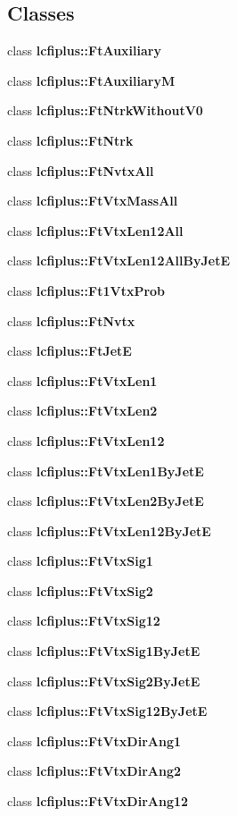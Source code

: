 \subsection*{Classes}
\begin{DoxyCompactItemize}
\item 
class {\bf lcfiplus\-::\-Ft\-Auxiliary}
\item 
class {\bf lcfiplus\-::\-Ft\-Auxiliary\-M}
\item 
class {\bf lcfiplus\-::\-Ft\-Ntrk\-Without\-V0}
\item 
class {\bf lcfiplus\-::\-Ft\-Ntrk}
\item 
class {\bf lcfiplus\-::\-Ft\-Nvtx\-All}
\item 
class {\bf lcfiplus\-::\-Ft\-Vtx\-Mass\-All}
\item 
class {\bf lcfiplus\-::\-Ft\-Vtx\-Len12\-All}
\item 
class {\bf lcfiplus\-::\-Ft\-Vtx\-Len12\-All\-By\-Jet\-E}
\item 
class {\bf lcfiplus\-::\-Ft1\-Vtx\-Prob}
\item 
class {\bf lcfiplus\-::\-Ft\-Nvtx}
\item 
class {\bf lcfiplus\-::\-Ft\-Jet\-E}
\item 
class {\bf lcfiplus\-::\-Ft\-Vtx\-Len1}
\item 
class {\bf lcfiplus\-::\-Ft\-Vtx\-Len2}
\item 
class {\bf lcfiplus\-::\-Ft\-Vtx\-Len12}
\item 
class {\bf lcfiplus\-::\-Ft\-Vtx\-Len1\-By\-Jet\-E}
\item 
class {\bf lcfiplus\-::\-Ft\-Vtx\-Len2\-By\-Jet\-E}
\item 
class {\bf lcfiplus\-::\-Ft\-Vtx\-Len12\-By\-Jet\-E}
\item 
class {\bf lcfiplus\-::\-Ft\-Vtx\-Sig1}
\item 
class {\bf lcfiplus\-::\-Ft\-Vtx\-Sig2}
\item 
class {\bf lcfiplus\-::\-Ft\-Vtx\-Sig12}
\item 
class {\bf lcfiplus\-::\-Ft\-Vtx\-Sig1\-By\-Jet\-E}
\item 
class {\bf lcfiplus\-::\-Ft\-Vtx\-Sig2\-By\-Jet\-E}
\item 
class {\bf lcfiplus\-::\-Ft\-Vtx\-Sig12\-By\-Jet\-E}
\item 
class {\bf lcfiplus\-::\-Ft\-Vtx\-Dir\-Ang1}
\item 
class {\bf lcfiplus\-::\-Ft\-Vtx\-Dir\-Ang2}
\item 
class {\bf lcfiplus\-::\-Ft\-Vtx\-Dir\-Ang12}

\end{DoxyCompactItemize}
